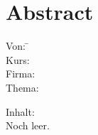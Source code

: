\section*{Abstract}
\label{sec:Abstract}

\begin{tabbing}
Von:	 \hspace{20mm} \= \autor\\
Kurs:	  \>\kursbez\\
Firma:	  \>\firmenname\\
Thema:	  \>\titel\\
\end{tabbing}

Inhalt:\\
Noch leer.

